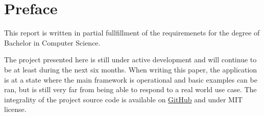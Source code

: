 \chapter{Preface}
This report is written in partial fullfillment of the requiremenets for the degree of Bachelor in Computer Science. 

The project presented here is still under active development and will continue to be at least during the next six months. When writing this paper, the application is at a state where the main framework is operational and basic examples can be ran, but is still very far from being able to respond to a real world use case. The integrality of the project source code is available on \href{https://github.com/tuvistavie/scala-x-server}{GitHub} and under MIT license.
